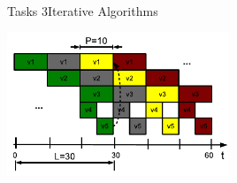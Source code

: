 \begin{frame}[allowframebreaks]{Tasks 3}{Iterative Algorithms}
  \begin{solutionnoinc}
    \centering
    \includegraphics[width=0.5\textwidth]{./figures/task3_scheudling_result_video_codec_pipelined.png}
  \end{solutionnoinc}
\end{frame}
